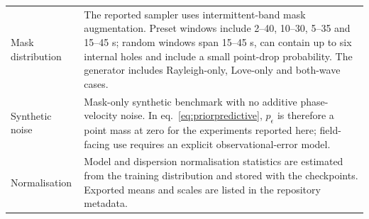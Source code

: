 \documentclass[referee]{gji}
\begin{document}
\begin{longtable}{@{}p{}p{}@{}}
Mask distribution & The reported sampler uses intermittent-band mask augmentation. Preset windows include 2--40, 10--30, 5--35 and 15--45 s; random windows span 15--45 s, can contain up to six internal holes and include a small point-drop probability. The generator includes Rayleigh-only, Love-only and both-wave cases. \\
Synthetic noise & Mask-only synthetic benchmark with no additive phase-velocity noise. In eq.~\eqref{eq:priorpredictive}, $p_\epsilon$ is therefore a point mass at zero for the experiments reported here; field-facing use requires an explicit observational-error model. \\
Normalisation & Model and dispersion normalisation statistics are estimated from the training distribution and stored with the checkpoints. Exported means and scales are listed in the repository metadata. \\
\end{longtable}
\normalsize
\end{document}
